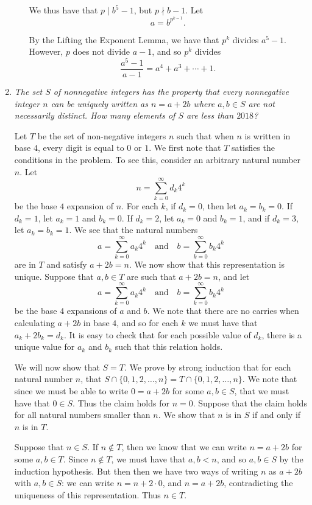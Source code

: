 \documentclass{article}
\begin{document}
\begin{enumerate}[1.]
\begin{enumerate}
We thus have that $p \mid b^5 - 1$, but $p \nmid b - 1$. Let
\[
	a = b^{p^{k - 1}}.
\]

By the Lifting the Exponent Lemma, we have that $p^k$ divides $a^5 - 1$. However, $p$ does not divide $a - 1$, and so $p^k$ divides
\[
	\frac{a^5 - 1}{a - 1} = a^4 + a^3 + \cdots + 1.
\]

\end{enumerate}


\vspace{6pt}
\item %
\textit{The set $S$ of nonnegative integers has the property that every nonnegative integer $n$ can be uniquely written as $n = a+2b$ where $a,b \in S$ are not necessarily distinct. How many elements of $S$ are less than $2018$?
}

Let $T$ be the set of non-negative integers $n$ such that when $n$ is written in base $4$, every digit is equal to $0$ or $1$. We first note that $T$ satisfies the conditions in the problem. To see this, consider an arbitrary natural number $n$. Let
\[
	n = \sum_{k = 0}^{\infty} d_k 4^k
\]
be the base $4$ expansion of $n$. For each $k$, if $d_k = 0$, then let $a_k = b_k = 0$. If $d_k = 1$, let $a_k = 1$ and $b_k = 0$. If $d_k = 2$, let $a_k = 0$ and $b_k = 1$, and if $d_k = 3$, let $a_k = b_k = 1$. We see that the natural numbers
\[
	a = \sum_{k = 0}^{\infty} a_k 4^k \quad \text{and} \quad b = \sum_{k = 0}^{\infty} b_k 4^k
\]
are in $T$ and satisfy $a + 2b = n$. We now show that this representation is unique. Suppose that $a, b \in T$ are such that $a + 2b = n$, and let
\[
	a = \sum_{k = 0}^{\infty} a_k 4^k \quad \text{and} \quad b = \sum_{k = 0}^{\infty} b_k 4^k
\]
be the base $4$ expansions of $a$ and $b$. We note that there are no carries when calculating $a + 2b$ in base $4$, and so for each $k$ we must have that $a_k + 2b_k = d_k$. It is easy to check that for each possible value of $d_k$, there is a unique value for $a_k$ and $b_k$ such that this relation holds.

We will now show that $S = T$. We prove by strong induction that for each natural number $n$, that $S \cap \{0, 1, 2, \dots, n\} = T \cap \{0, 1, 2, \dots, n\}$. We note that since we must be able to write $0 = a + 2b$ for some $a, b \in S$, that we must have that $0 \in S$. Thus the claim holds for $n = 0$. Suppose that the claim holds for all natural numbers smaller than $n$. We show that $n$ is in $S$ if and only if $n$ is in $T$.

Suppose that $n \in S$. If $n \not\in T$, then we know that we can write $n = a + 2b$ for some $a, b \in T$. Since $n \not\in T$, we must have that $a, b < n$, and so $a, b \in S$ by the induction hypothesis. But then then we have two ways of writing $n$ as $a + 2b$ with $a, b \in S$: we can write $n = n + 2 \cdot 0$, and $n = a + 2b$, contradicting the uniqueness of this representation. Thus $n \in T$.


\end{enumerate}
\end{document}
